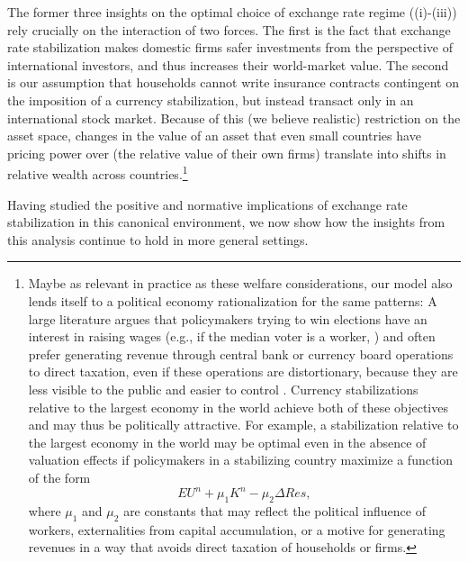 \documentclass[12pt,letter]{article}
\theoremstyle{break} \theorembodyfont{\normalfont\itshape}
\theoremstyle{break}
\theoremstyle{break} \theorembodyfont{\normalfont\itshape}
\theoremstyle{break} \theorembodyfont{\normalfont\itshape}
\begin{document}
The former three insights on the optimal choice of exchange rate
regime ((i)-(iii)) rely crucially on the interaction of two forces.
The first is the fact that exchange rate stabilization makes domestic
firms safer investments from the perspective of international
investors, and thus increases their world-market value. The second is
our assumption that households cannot write insurance contracts
contingent on the imposition of a currency stabilization, but instead
transact only in an international stock market. Because of this (we
believe realistic) restriction on the asset space, changes in the
value of an asset that even small countries have pricing power over
(the relative value of their own firms) translate into shifts in
relative wealth across countries.\footnote{Maybe as relevant in
  practice as these welfare considerations, our model also lends
  itself to a political economy rationalization for the same patterns:
  A large literature argues that policymakers trying to win elections
  have an interest in raising wages (e.g., if the median voter is a
  worker, \cite{PerssonTabellini2002}) and often prefer generating
  revenue through central bank or currency board operations to direct
  taxation, even if these operations are distortionary, because they
  are less visible to the public and easier to control
  \citep{CukiermanEdwardsTabellini1992,Bates2005}. Currency
  stabilizations relative to the largest economy in the world achieve
  both of these objectives and may thus be politically attractive. For
  example, a stabilization relative to the largest economy in the
  world may be optimal even in the absence of valuation effects if
  policymakers in a stabilizing country maximize a function of the
  form $$EU^n+\mu_1K^n-\mu_{2}\Delta Res, $$ where \(\mu_{1}\) and
  \(\mu_2\) are constants that may reflect the political influence of
  workers, externalities from capital accumulation, or a motive for
  generating revenues in a way that avoids direct taxation of
  households or firms.}

  

 












\bigskip

Having studied the positive and normative implications of exchange
rate stabilization in this canonical environment, we now show how the
insights from this analysis continue to hold in more general settings.
\end{document}
